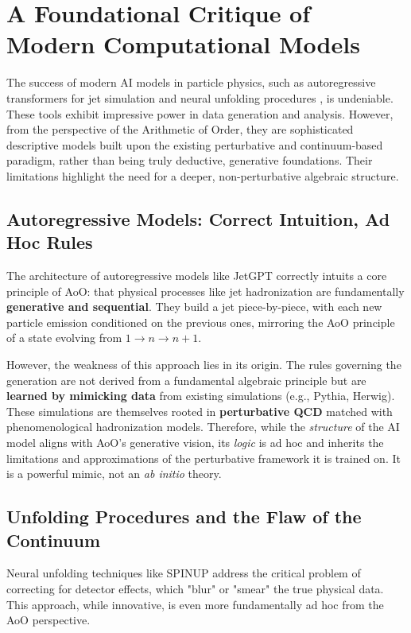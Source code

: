 \documentclass[11pt, a4paper]{article}
\theoremstyle{definition}
\theoremstyle{remark}
\begin{document}
\newpage
\section{A Foundational Critique of Modern Computational Models}

The success of modern AI models in particle physics, such as autoregressive transformers for jet simulation \cite{JetGPT} and neural unfolding procedures \cite{SPINUP}, is undeniable. These tools exhibit impressive power in data generation and analysis. However, from the perspective of the Arithmetic of Order, they are sophisticated descriptive models built upon the existing perturbative and continuum-based paradigm, rather than being truly deductive, generative foundations. Their limitations highlight the need for a deeper, non-perturbative algebraic structure.

\subsection{Autoregressive Models: Correct Intuition, Ad Hoc Rules}
The architecture of autoregressive models like JetGPT \cite{JetGPT} correctly intuits a core principle of AoO: that physical processes like jet hadronization are fundamentally \textbf{generative and sequential}. They build a jet piece-by-piece, with each new particle emission conditioned on the previous ones, mirroring the AoO principle of a state evolving from $1 \to n \to n+1$.

However, the weakness of this approach lies in its origin. The rules governing the generation are not derived from a fundamental algebraic principle but are \textbf{learned by mimicking data} from existing simulations (e.g., Pythia, Herwig). These simulations are themselves rooted in \textbf{perturbative QCD} matched with phenomenological hadronization models. Therefore, while the \textit{structure} of the AI model aligns with AoO's generative vision, its \textit{logic} is ad hoc and inherits the limitations and approximations of the perturbative framework it is trained on. It is a powerful mimic, not an \textit{ab initio} theory.

\subsection{Unfolding Procedures and the Flaw of the Continuum}
Neural unfolding techniques like SPINUP \cite{SPINUP} address the critical problem of correcting for detector effects, which "blur" or "smear" the true physical data. This approach, while innovative, is even more fundamentally ad hoc from the AoO perspective.
\end{document}
